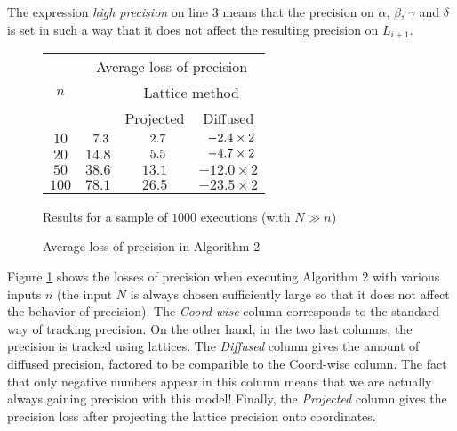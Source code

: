 \documentclass{sig-alternate-2013}
\begin{document}
\noindent
The expression \emph{high precision} on line 3 means that the precision on 
$\alpha$, $\beta$, $\gamma$ and $\delta$ is set in such a way that it 
does not affect the resulting precision on $L_{i+1}$.
%
\begin{figure}
\begin{center}
\renewcommand{\arraystretch}{1.2}
\begin{tabular}{|c|c|c|c|}
\hline
\multirow{3}{*}{\hspace{0.2cm}$n$\hspace{0.2cm}} & 
\multicolumn{3}{|c|}{Average loss of precision} \\
\cline{2-4}
& \raisebox{-0.05cm}{Coord-wise} & 
\multicolumn{2}{|c|}{Lattice method} \\
\cline{3-4}
& \raisebox{0.04cm}{method} & 
\hspace{0.2cm}Projected\hspace{0.2cm} & 
\hspace{0.2cm}Diffused\hspace{0.2cm} \\
\hline 
$10$ & $\hphantom{0}7.3$ & $\hphantom{0}2.7$ & $\hphantom{0}{-}2.4 \times 2$ \\
$20$ & $14.8$ & $\hphantom{0}5.5$ & $\hphantom{0}{-}4.7 \times 2$ \\
$50$ & $38.6$ & $13.1$ & $-12.0 \times 2$ \\
$100$ & $78.1$ & $26.5$ & $-23.5 \times 2$ \\
\hline
\end{tabular}

\smallskip

{\small
Results for a sample of $1000$ executions (with $N \gg n$)}
\end{center}
\renewcommand{\arraystretch}{1}

\vspace{-0.4cm}

\caption{Average loss of precision in Algorithm 2}
\label{fig:vectorspace}

\vspace{-0.2cm}

\end{figure}
%
Figure \ref{fig:vectorspace} shows the losses of precision when
executing Algorithm 2 with various inputs $n$ (the input $N$ is
always chosen sufficiently large so that it does not affect the
behavior of precision). The \emph{Coord-wise} column corresponds to
the standard way of tracking precision. On the other hand, in the two 
last columns, the precision is tracked using lattices. The \emph{Diffused}
column gives the amount of diffused precision, factored to be comparible
to the Coord-wise column. 
The fact that only negative numbers appear in this column means that we 
are actually always gaining precision with this model! Finally, the 
\emph{Projected} column gives the precision loss after projecting the lattice
precision onto coordinates.
\end{document}
